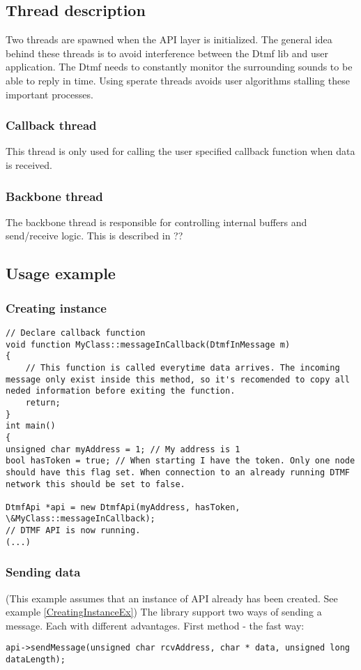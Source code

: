 \subsection{Thread description}
Two threads are spawned when the API layer is initialized. The general idea behind these threads is to avoid interference between the Dtmf lib and user application. The Dtmf needs to constantly monitor the surrounding sounds to be able to reply in time. Using sperate threads avoids user algorithms stalling these important processes.

\subsubsection{Callback thread}
This thread is only used for calling the user specified callback function when data is received. 

\subsubsection{Backbone thread}
The backbone thread is responsible for controlling internal buffers and send/receive logic. This is described in ?? 


\subsection{Usage example}
\subsubsection{Creating instance}
\begin{lstlisting}[caption={Creating instance example},label=CreatingInstanceEx]
// Declare callback function
void function MyClass::messageInCallback(DtmfInMessage m)
{
    // This function is called everytime data arrives. The incoming message only exist inside this method, so it's recomended to copy all neded information before exiting the function.
    return;
}
int main()
{
unsigned char myAddress = 1; // My address is 1
bool hasToken = true; // When starting I have the token. Only one node should have this flag set. When connection to an already running DTMF network this should be set to false.

DtmfApi *api = new DtmfApi(myAddress, hasToken, \&MyClass::messageInCallback);
// DTMF API is now running.
(...)
\end{lstlisting}

\subsubsection{Sending data}
(This example assumes that an instance of API already has been created. See example \ref{CreatingInstanceEx})
The library support two ways of sending a message. Each with different advantages.
First method - the fast way:
\begin{lstlisting}[caption={Sending data example 1},label=SendingDataEx1]
api->sendMessage(unsigned char rcvAddress, char * data, unsigned long dataLength);
\end{lstlisting}

